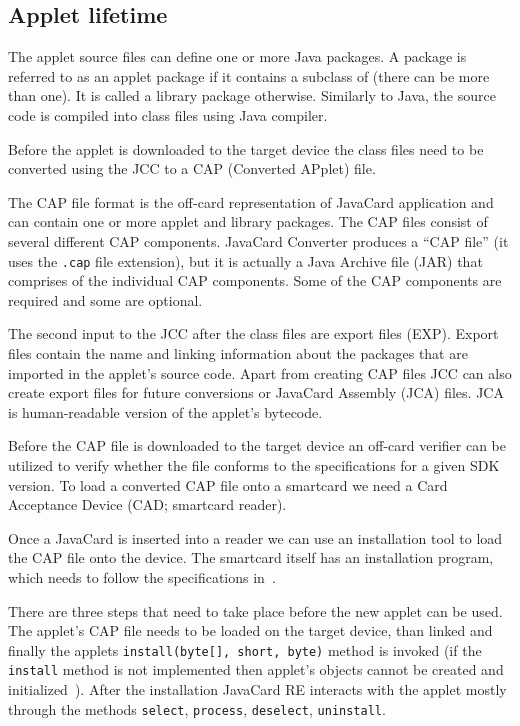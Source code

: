 \documentclass{../llncs/llncs}
\begin{document}
    \subsection{Applet lifetime}
The applet source files can define one or more Java packages. A package is referred to as an applet package if it contains a subclass of  (there can be more than one). It is called a library package otherwise.  Similarly to Java, the source code is compiled into class files using Java compiler.

Before the applet is downloaded to the target device the class files need to be converted using the JCC to a CAP (Converted APplet) file.

The CAP file format is the off-card representation of JavaCard application and can contain one or more applet and library packages. The CAP files consist of several different CAP components. JavaCard Converter produces a ``CAP file'' (it uses the \texttt{.cap} file extension), but it is actually a Java Archive file (JAR) that comprises of the individual CAP components. Some of the CAP components are required and some are optional.

The second input to the JCC after the class files are export files (EXP). Export files contain the name and linking information about the packages that are imported in the applet's source code.
Apart from creating CAP files JCC can also create export files for future conversions or JavaCard Assembly (JCA) files. JCA is human-readable version of the applet's bytecode.

Before the CAP file is downloaded to the target device an off-card verifier can be utilized to verify whether the file conforms to the specifications for a given SDK version. To load a converted CAP file onto a smartcard we need a Card Acceptance Device (CAD; smartcard reader).

Once a JavaCard is inserted into a reader we can use an installation tool to load the CAP file onto the device. The smartcard itself has an installation program, which needs to follow the specifications in~\cite{jcspecs31download}.

There are three steps that need to take place before the new applet can be used. The applet's CAP file needs to be loaded on the target device, than linked and finally the applets \texttt{install(byte[], short, byte)} method is invoked (if the \texttt{install} method is not implemented then applet's objects cannot be created and initialized~\cite{jcspecs31download}). After the installation JavaCard RE interacts with the applet mostly through the methods \texttt{select}, \texttt{process}, \texttt{deselect}, \texttt{uninstall}.
\end{document}
